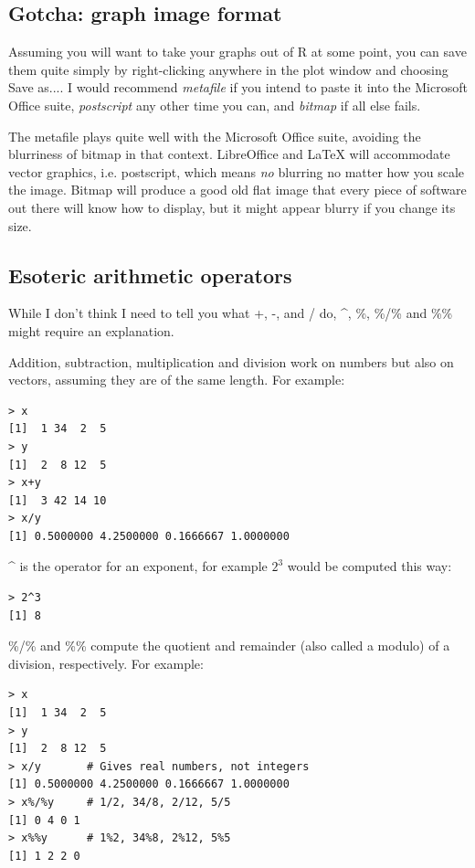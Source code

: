\documentclass{report}
\newcommand{\code}[1]{\textsf{\ttfamily #1}}
\begin{document}
			\subsection{Gotcha: graph image format}
			Assuming you will want to take your graphs out of R at some point, you can save them quite simply by right-clicking anywhere in the plot window and choosing \code{Save as...}. I would recommend \emph{metafile} if you intend to paste it into the Microsoft Office suite, \emph{postscript} any other time you can, and \emph{bitmap} if all else fails.
			
			The metafile plays quite well with the Microsoft Office suite, avoiding the blurriness of bitmap in that context. LibreOffice and LaTeX will accommodate vector graphics, i.e. postscript, which means \emph{no} blurring no matter how you scale the image. Bitmap will produce a good old flat image that every piece of software out there will know how to display, but it might appear blurry if you change its size.
			
			\subsection{Esoteric arithmetic operators}
			
			While I don't think I need to tell you what \code{+}, \code{-}, \code{*} and \code{/} do, \code{\^}, \code{\%}, \code{\%/\%} and \code{\%\%} might require an explanation.
			
			Addition, subtraction, multiplication and division work on numbers but also on vectors, assuming they are of the same length. For example:
			\begin{verbatim}
> x
[1]  1 34  2  5
> y
[1]  2  8 12  5
> x+y
[1]  3 42 14 10
> x/y
[1] 0.5000000 4.2500000 0.1666667 1.0000000
			\end{verbatim}
			
			\code{\^} is the operator for an exponent, for example $2^3$ would be computed this way:
			\begin{verbatim}
> 2^3
[1] 8
			\end{verbatim}
			
			\code{\%/\%} and \code{\%\%} compute the quotient and remainder (also called a modulo) of a division, respectively. For example:
			\begin{verbatim}
> x
[1]  1 34  2  5
> y
[1]  2  8 12  5
> x/y       # Gives real numbers, not integers
[1] 0.5000000 4.2500000 0.1666667 1.0000000
> x%/%y     # 1/2, 34/8, 2/12, 5/5
[1] 0 4 0 1
> x%%y      # 1%2, 34%8, 2%12, 5%5
[1] 1 2 2 0
			\end{verbatim}
	
\end{document}
